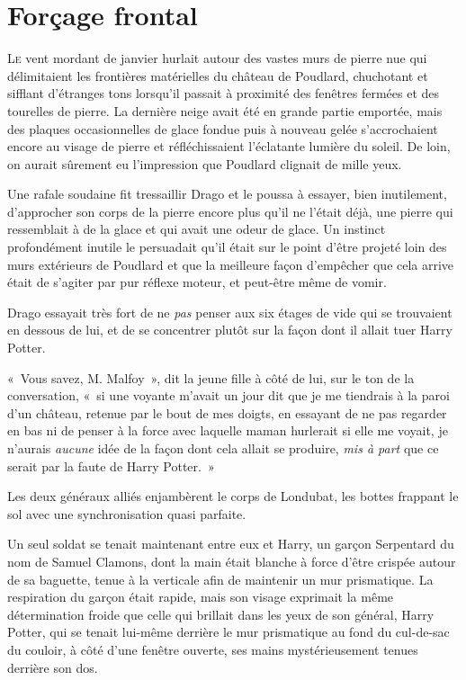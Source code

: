 \chapter{Forçage frontal}

\lettrine{L}{e} vent mordant de janvier hurlait autour des vastes murs de pierre nue qui délimitaient les frontières matérielles du château de Poudlard, chuchotant et sifflant d'étranges tons lorsqu'il passait à proximité des fenêtres fermées et des tourelles de pierre.
La dernière neige avait été en grande partie emportée, mais des plaques occasionnelles de glace fondue puis à nouveau gelée s'accrochaient encore au visage de pierre et réfléchissaient l'éclatante lumière du soleil.
De loin, on aurait sûrement eu l'impression que Poudlard clignait de mille yeux.

Une rafale soudaine fit tressaillir Drago et le poussa à essayer, bien inutilement, d'approcher son corps de la pierre encore plus qu'il ne l'était déjà, une pierre qui ressemblait à de la glace et qui avait une odeur de glace.
Un instinct profondément inutile le persuadait qu'il était sur le point d'être projeté loin des murs extérieurs de Poudlard et que la meilleure façon d'empêcher que cela arrive était de s'agiter par pur réflexe moteur, et peut-être même de vomir.

Drago essayait très fort de ne \emph{pas} penser aux six étages de vide qui se trouvaient en dessous de lui, et de se concentrer plutôt sur la façon dont il allait tuer Harry Potter.

«~Vous savez, M. Malfoy~», dit la jeune fille à côté de lui, sur le ton de la conversation, «~si une voyante m'avait un jour dit que je me tiendrais à la paroi d'un château, retenue par le bout de mes doigts, en essayant de ne pas regarder en bas ni de penser à la force avec laquelle maman hurlerait si elle me voyait, je n'aurais \emph{aucune} idée de la façon dont cela allait se produire, \emph{mis à part} que ce serait par la faute de Harry Potter.~»


Les deux généraux alliés enjambèrent le corps de Londubat, les bottes frappant le sol avec une synchronisation quasi parfaite.

Un seul soldat se tenait maintenant entre eux et Harry, un garçon Serpentard du nom de Samuel Clamons, dont la main était blanche à force d'être crispée autour de sa baguette, tenue à la verticale afin de maintenir un mur prismatique.
La respiration du garçon était rapide, mais son visage exprimait la même détermination froide que celle qui brillait dans les yeux de son général, Harry Potter, qui se tenait lui-même derrière le mur prismatique au fond du cul-de-sac du couloir, à côté d'une fenêtre ouverte, ses mains mystérieusement tenues derrière son dos.

